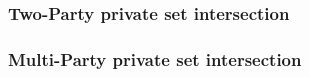 \subsubsection{Two-Party private set intersection}
%
%




\subsubsection{Multi-Party private set intersection}